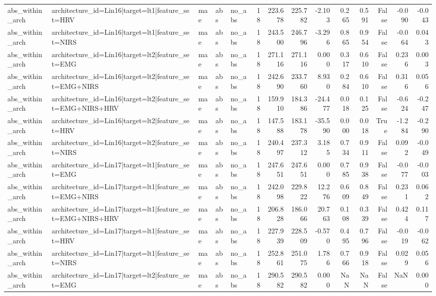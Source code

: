 \begin{table}
\begin{tabular}{lllllrrrrrrrrr}
abs_within_arch & architecture_id=Lin16|target=lt1|feature_set=HRV & mae & abs & no_abs & 18 & 223.678 & 225.782 & -2.103 & 0.265 & 0.591 & False & -0.090 & -0.043 \\
abs_within_arch & architecture_id=Lin16|target=lt1|feature_set=NIRS & mae & abs & no_abs & 18 & 243.500 & 246.796 & -3.296 & 0.865 & 0.954 & False & -0.064 & 0.043 \\
abs_within_arch & architecture_id=Lin16|target=lt2|feature_set=EMG & mae & abs & no_abs & 18 & 271.116 & 271.116 & 0.000 & 0.317 & 0.610 & False & 0.236 & 0.003 \\
abs_within_arch & architecture_id=Lin16|target=lt2|feature_set=EMG+NIRS & mae & abs & no_abs & 18 & 242.690 & 233.760 & 8.930 & 0.284 & 0.610 & False & 0.316 & 0.056 \\
abs_within_arch & architecture_id=Lin16|target=lt2|feature_set=EMG+NIRS+HRV & mae & abs & no_abs & 18 & 159.910 & 184.386 & -24.477 & 0.018 & 0.125 & False & -0.624 & -0.247 \\
abs_within_arch & architecture_id=Lin16|target=lt2|feature_set=HRV & mae & abs & no_abs & 18 & 147.588 & 183.178 & -35.590 & 0.000 & 0.018 & True & -1.284 & -0.290 \\
abs_within_arch & architecture_id=Lin16|target=lt2|feature_set=NIRS & mae & abs & no_abs & 18 & 240.497 & 237.312 & 3.185 & 0.734 & 0.911 & False & 0.092 & -0.049 \\
abs_within_arch & architecture_id=Lin17|target=lt1|feature_set=EMG & mae & abs & no_abs & 18 & 247.651 & 247.651 & 0.000 & 0.785 & 0.938 & False & -0.077 & -0.003 \\
abs_within_arch & architecture_id=Lin17|target=lt1|feature_set=EMG+NIRS & mae & abs & no_abs & 18 & 242.098 & 229.822 & 12.276 & 0.609 & 0.849 & False & 0.231 & 0.062 \\
abs_within_arch & architecture_id=Lin17|target=lt1|feature_set=EMG+NIRS+HRV & mae & abs & no_abs & 18 & 206.828 & 186.066 & 20.763 & 0.108 & 0.339 & False & 0.424 & 0.117 \\
abs_within_arch & architecture_id=Lin17|target=lt1|feature_set=HRV & mae & abs & no_abs & 18 & 227.939 & 228.509 & -0.570 & 0.495 & 0.796 & False & -0.019 & -0.062 \\
abs_within_arch & architecture_id=Lin17|target=lt1|feature_set=NIRS & mae & abs & no_abs & 18 & 252.861 & 251.075 & 1.786 & 0.766 & 0.918 & False & 0.029 & 0.056 \\
abs_within_arch & architecture_id=Lin17|target=lt2|feature_set=EMG & mae & abs & no_abs & 18 & 290.582 & 290.582 & 0.000 & NaN & NaN & False & NaN & 0.000 \\

\end{tabular}
\end{table}
